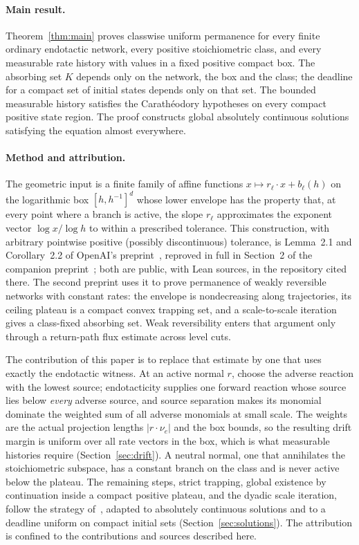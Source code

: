 \documentclass[11pt]{article}
\theoremstyle{definition}
\theoremstyle{remark}
\begin{document}
\paragraph{Main result.}
Theorem~\ref{thm:main} proves classwise uniform permanence for every finite
ordinary endotactic network, every positive stoichiometric class, and every
measurable rate history with values in a fixed positive compact box. The
absorbing set $K$ depends only on the network, the box and the class; the
deadline for a compact set of initial states depends only on that set. The
bounded measurable history satisfies the Carath\'eodory hypotheses on every
compact positive state region. The proof constructs global absolutely continuous
solutions satisfying the equation almost everywhere.

\paragraph{Method and attribution.}
The geometric input is a finite family of affine functions
$x\mapsto r_\ell\cdot x+b_\ell(h)$ on the logarithmic box $[h,h^{-1}]^d$ whose
lower envelope has the property that, at every point where a branch is active, the
slope $r_\ell$ approximates the exponent vector $\log x/\log h$ to within a
prescribed tolerance. This construction, with arbitrary pointwise positive
(possibly discontinuous) tolerance, is Lemma~2.1 and Corollary~2.2 of OpenAI's
preprint~\cite{OpenAI2026Boundedness}, reproved in full in Section~2 of the
companion preprint~\cite{OpenAI2026Uniform}; both are public, with Lean sources,
in the repository cited there. The second preprint uses it to prove permanence of
weakly reversible networks with constant rates: the envelope is nondecreasing along
trajectories, its ceiling plateau is a compact convex trapping set, and a
scale-to-scale iteration gives a class-fixed absorbing set. Weak reversibility
enters that argument only through a return-path flux estimate across level cuts.

The contribution of this paper is to replace that estimate by one that uses
exactly the endotactic witness. At an active normal $r$, choose the adverse
reaction with the lowest source; endotacticity supplies one forward reaction whose
source lies below \emph{every} adverse source, and source separation makes its
monomial dominate the weighted sum of all adverse monomials at small scale. The
weights are the actual projection lengths $|r\cdot\nu_e|$ and the box bounds, so
the resulting drift margin is uniform over all rate vectors in the box, which is
what measurable histories require (Section~\ref{sec:drift}). A neutral normal, one
that annihilates the stoichiometric subspace, has a constant branch on the class
and is never active below the plateau. The remaining steps, strict trapping,
global existence by continuation inside a compact positive plateau, and the dyadic
scale iteration, follow the strategy of~\cite{OpenAI2026Uniform}, adapted to
absolutely continuous solutions and to a deadline uniform on compact initial sets
(Section~\ref{sec:solutions}). The attribution is confined to the contributions
and sources described here.
\end{document}
